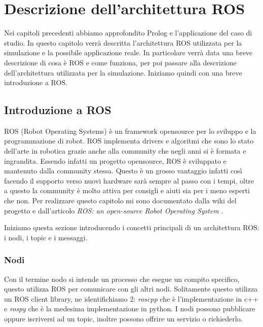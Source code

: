 \chapter{Descrizione dell'architettura ROS}
\label{cha:descrizionearchros}
Nei capitoli precedenti abbiamo approfondito Prolog e l'applicazione del caso di studio. In questo capitolo verrà descritta l'architettura ROS utilizzata per la simulazione e la possibile applicazione reale.
In particolare verrà data una breve descrizione di cosa è ROS e come funziona, per poi passare alla descrizione dell'architettura utilizzata per la simulazione. Iniziamo quindi con una breve introduzione a ROS.

\section{Introduzione a ROS}
\label{sec:introduzione_ros}
ROS (Robot Operating Systems) è un framework opensource per lo sviluppo e la programmazione di robot. ROS implementa drivers e algoritmi che sono lo stato dell'arte in robotica grazie anche alla community che negli anni si è formata e ingrandita.
Essendo infatti un progetto opensource, ROS è sviluppato e mantenuto dalla community stessa. Questo è un grosso vantaggio infatti così facendo il supporto verso nuovi hardware sarà sempre al passo con i tempi, oltre a questo la community è molto attiva per consigli e aiuti sia per i meno esperti che non.
Per realizzare questo capitolo mi sono documentato dalla wiki del progetto \cite{rossite} e dall'articolo \textit{ROS: an open-source Robot Operating System} \cite{inproceedings}.

Iniziamo questa sezione introducendo i concetti principali di un architettura ROS: i nodi, i topic e i messaggi.

\subsection{Nodi}
\label{subsec:nodi}
Con il termine nodo si intende un processo che esegue un compito specifico, questo utilizza ROS per comunicare con gli altri nodi. Solitamente questo utilizza un ROS client library, ne identifichiamo 2: \textit{roscpp} che è l'implementazione in c++ e \textit{rospy} che è la medesima implementazione in python. I nodi possono pubblicare oppure iscriversi ad un topic, inoltre possono offrire un servizio o richiederlo. 

